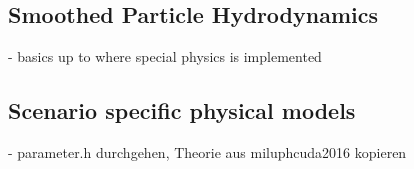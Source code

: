 \subsection{Smoothed Particle Hydrodynamics}
- basics up to where special physics is implemented

\subsection{Scenario specific physical models}
- parameter.h durchgehen, Theorie aus miluphcuda2016 kopieren